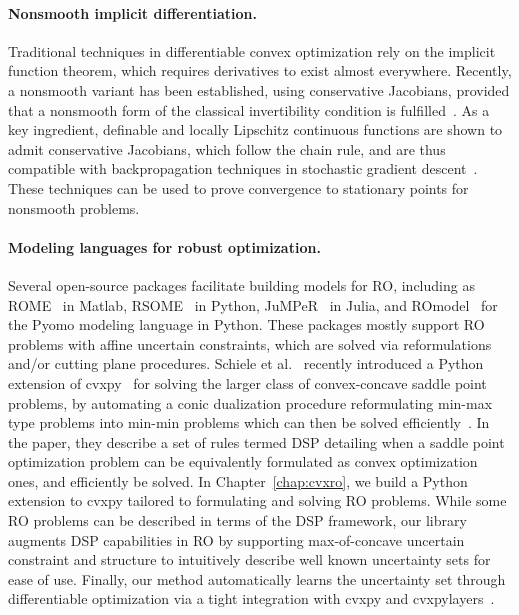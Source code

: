 
\paragraph{Nonsmooth implicit differentiation.} Traditional techniques in differentiable convex optimization rely on the implicit function theorem, which requires derivatives to exist almost everywhere.
Recently, a nonsmooth variant has been established, using conservative Jacobians, provided that a nonsmooth form of the classical invertibility condition is fulfilled~\citep{path-diff}.
As a key ingredient, definable and locally Lipschitz continuous functions are shown to admit conservative Jacobians, which follow the chain rule, and are thus compatible with backpropagation techniques in stochastic gradient descent~\citep{Davis,path-diff}.
These techniques can be used to prove convergence to stationary points for nonsmooth problems.


\paragraph{Modeling languages for robust optimization.}
Several open-source packages facilitate building models for \gls{RO}, including as ROME~\citep{ROME} in Matlab, RSOME~\citep{Rsome} in Python, JuMPeR~\citep{jumpr} in Julia, and ROmodel~\citep{pyomo} for the Pyomo modeling language in Python.
These packages mostly support \gls{RO} problems with affine uncertain constraints, which are solved via reformulations and/or cutting plane procedures.
Schiele et al.~\cite{dsp} recently introduced a Python extension of cvxpy~\citep{diamond2016cvxpy} for solving the larger class of convex-concave saddle point problems, by automating a conic dualization procedure reformulating min-max type problems into min-min problems which can then be solved efficiently~\citep{juditsky2022}.
In the paper, they describe a set of rules termed \gls{DSP} detailing when a saddle point optimization problem can be equivalently formulated as convex optimization ones, and efficiently be solved.
In Chapter~\ref{chap:cvxro}, we build a Python extension to cvxpy tailored to formulating and solving \gls{RO} problems.
While some \gls{RO} problems can be described in terms of the \gls{DSP} framework, our library augments \gls{DSP} capabilities in \gls{RO} by supporting max-of-concave uncertain constraint and structure to intuitively describe well known uncertainty sets for ease of use.
Finally, our method automatically learns the uncertainty set through differentiable optimization via a tight integration with cvxpy and cvxpylayers~\cite{cvxpylayers2019,diffcp2019}.
